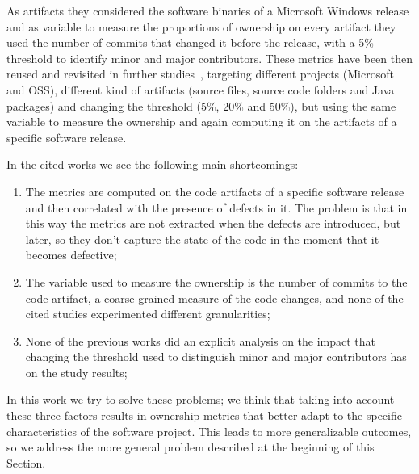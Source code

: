 As artifacts they considered the software binaries of a Microsoft Windows release and as variable to measure the proportions of ownership on every artifact they used the number of commits that changed it before the release, with a 5\% threshold to identify minor and major contributors.
These metrics have been then reused and revisited in further studies~\cite{Foucault:oss, Greiler:replication}, targeting different projects (Microsoft and OSS), different kind of artifacts (source files, source code folders and Java packages) and changing the threshold (5\%, 20\% and 50\%), but using the same variable to measure the ownership and again computing it on the artifacts of a specific software release.

In the cited works we see the following main shortcomings:
\begin{enumerate}
    \item The metrics are computed on the code artifacts of a specific software release and then correlated with the presence of defects in it. The problem is that in this way the metrics are not extracted when the defects are introduced, but later, so they don't capture the state of the code in the moment that it becomes defective;
    \item The variable used to measure the ownership is the number of commits to the code artifact, a coarse-grained measure of the code changes, and none of the cited studies experimented different granularities;
    \item None of the previous works did an explicit analysis on the impact that changing the threshold used to distinguish minor and major contributors has on the study results;
\end{enumerate}

In this work we try to solve these problems; we think that taking into account these three factors results in ownership metrics that better adapt to the specific characteristics of the software project. This leads to more generalizable outcomes, so we address the more general problem described at the beginning of this Section.


